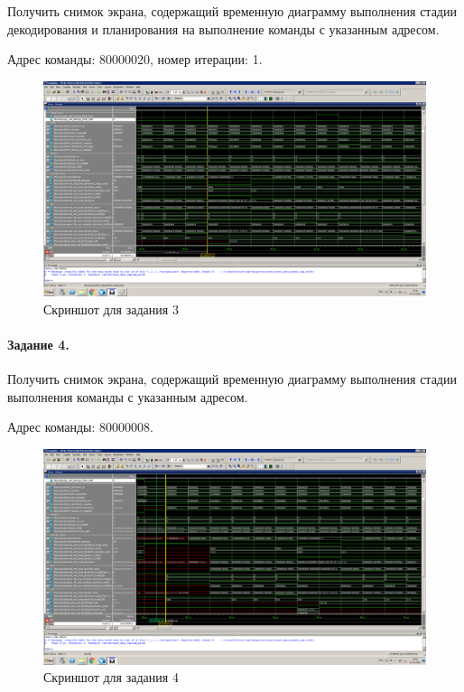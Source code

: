 Получить снимок экрана, содержащий временную диаграмму выполнения стадии декодирования и планирования на выполнение команды с указанным адресом.

Адрес команды: 80000020, номер итерации: 1.

\begin{figure}
	\includegraphics[width=\textwidth,height=\textheight,keepaspectratio]{img/img2.png}
	\caption{Скриншот для задания 3}
\end{figure}

\clearpage

\paragraph{Задание 4.}

Получить снимок экрана, содержащий временную диаграмму выполнения стадии выполнения команды с указанным адресом.

Адрес команды: 80000008.

\begin{figure}
	\includegraphics[width=\textwidth,height=\textheight,keepaspectratio]{img/img3.png}
	\caption{Скриншот для задания 4}
\end{figure}


